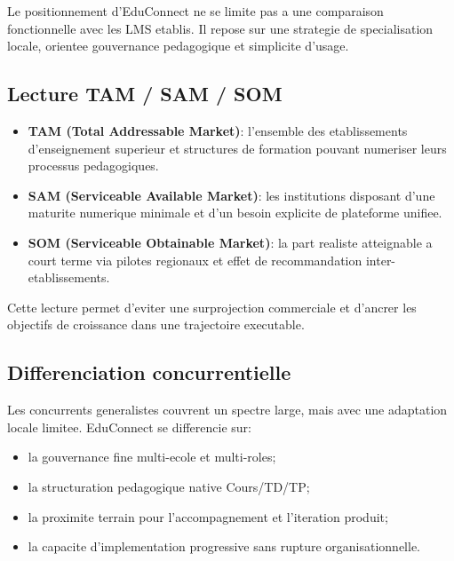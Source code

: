 ﻿\documentclass[12pt,a4paper,oneside]{report}
\begin{document}
Le positionnement d'EduConnect ne se limite pas a une comparaison fonctionnelle avec les LMS etablis. Il repose sur une strategie de specialisation locale, orientee gouvernance pedagogique et simplicite d'usage.

\subsection{Lecture TAM / SAM / SOM}

\begin{itemize}
  \item \textbf{TAM (Total Addressable Market)}: l'ensemble des etablissements d'enseignement superieur et structures de formation pouvant numeriser leurs processus pedagogiques.
  \item \textbf{SAM (Serviceable Available Market)}: les institutions disposant d'une maturite numerique minimale et d'un besoin explicite de plateforme unifiee.
  \item \textbf{SOM (Serviceable Obtainable Market)}: la part realiste atteignable a court terme via pilotes regionaux et effet de recommandation inter-etablissements.
\end{itemize}

Cette lecture permet d'eviter une surprojection commerciale et d'ancrer les objectifs de croissance dans une trajectoire executable.

\subsection{Differenciation concurrentielle}

Les concurrents generalistes couvrent un spectre large, mais avec une adaptation locale limitee. EduConnect se differencie sur:
\begin{itemize}
  \item la gouvernance fine multi-ecole et multi-roles;
  \item la structuration pedagogique native Cours/TD/TP;
  \item la proximite terrain pour l'accompagnement et l'iteration produit;
  \item la capacite d'implementation progressive sans rupture organisationnelle.
\end{itemize}
\end{document}
